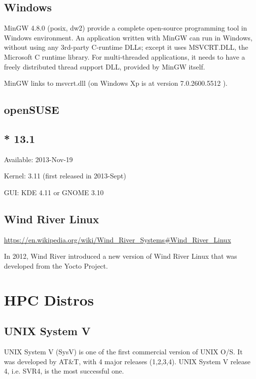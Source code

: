 \subsection{Windows}

MinGW 4.8.0 (posix, dw2) provide a complete open-source programming tool in
Windows environment. An application written with MinGW can run in Windows,
without using any 3rd-party C-runtime DLLs; except it uses MSVCRT.DLL, the
Microsoft C runtime library. For multi-threaded applications, it needs to have a
freely distributed thread support DLL, provided by MinGW itself.

MinGW links to msvcrt.dll (on Windows Xp is at version 7.0.2600.5512 ).



\subsection{openSUSE}

\subsection{* 13.1}

Available: 2013-Nov-19

Kernel: 3.11 (first released in 2013-Sept)

GUI: KDE 4.11 or GNOME 3.10


\subsection{Wind River Linux}

\url{https://en.wikipedia.org/wiki/Wind_River_Systems#Wind_River_Linux}

In 2012, Wind River introduced a new version of Wind River Linux that was
developed from the Yocto Project.


\section{HPC Distros}

\subsection{UNIX System V}
\label{sec:UNIX_System-V}
\label{sec:System-V}

UNIX System V (SysV) is one of the first commercial version of UNIX O/S.
It was developed by AT\&T, with 4 major releases (1,2,3,4). UNIX System V
release 4, i.e. SVR4, is the most successful one. 

